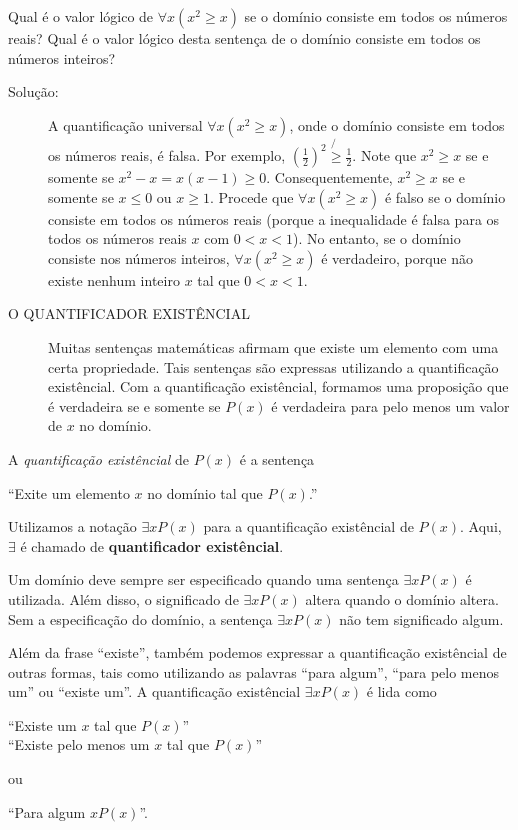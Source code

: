 \begin{exmp}
\label{exem137}
Qual é o valor lógico de $\forall x(x^2 \geq x)$ se o domínio consiste em todos
os números reais? Qual é o valor lógico desta sentença de o domínio consiste em
todos os números inteiros?
\begin{description}
\item[Solução:] A quantificação universal $\forall x(x^2 \geq x)$, onde o
domínio consiste em todos os números reais, é falsa. Por exemplo,
$(\frac{1}{2})^2 \not{\geq} \frac{1}{2}$. Note que $x^2 \geq x$ se e somente se
$x^2 - x = x(x-1) \geq 0$. Consequentemente, $x^2 \geq x$ se e somente se
$x\leq0$ ou $x\geq1$. Procede que $\forall x(x^2\geq x)$ é falso se o domínio
consiste em todos os números reais (porque a inequalidade é falsa para os todos
os números reais $x$ com $0<x<1$). No entanto, se o domínio consiste nos números
inteiros, $\forall x(x^2 \geq x)$ é verdadeiro, porque não existe nenhum inteiro
$x$ tal que $0<x<1$.
\end{description}
\end{exmp}

\begin{description}
\item[O QUANTIFICADOR EXISTÊNCIAL] Muitas sentenças matemáticas afirmam que
existe um elemento com uma certa propriedade. Tais sentenças são expressas
utilizando a quantificação existêncial. Com a quantificação existêncial,
formamos uma proposição que é verdadeira se e somente se $P(x)$ é verdadeira
para pelo menos um valor de $x$ no domínio.
\end{description}

\begin{defn}
\label{def110}
A \emph{quantificação existêncial} de $P(x)$ é a sentença
\begin{center}
``Exite um elemento $x$ no domínio tal que $P(x)$.''
\end{center} 
Utilizamos a notação $\exists xP(x)$ para a quantificação existêncial de $P(x)$.
Aqui, $\exists$ é chamado de \textbf{quantificador existêncial}.
\end{defn}

Um domínio deve sempre ser especificado quando uma sentença $\exists xP(x)$ é
utilizada. Além disso, o significado de $\exists xP(x)$ altera quando o domínio
altera. Sem a especificação do domínio, a sentença $\exists xP(x)$ não tem
significado algum.

Além da frase ``existe'', também podemos expressar a quantificação existêncial
de outras formas, tais como utilizando as palavras ``para algum'', ``para pelo
menos um'' ou ``existe um''. A quantificação existêncial $\exists xP(x)$ é lida
como
\begin{center}
``Existe um $x$ tal que $P(x)$''\\
``Existe pelo menos um $x$ tal que $P(x)$''
\end{center}
ou
\begin{center}
``Para algum $xP(x)$''.
\end{center}

